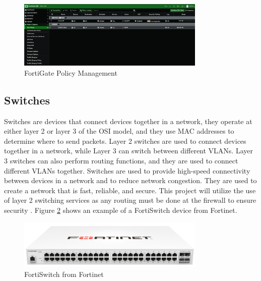 \documentclass[12pt]{report}
\begin{document}
\begin{figure}[h]
    \centering
    \includegraphics[width=0.8\textwidth]{images/Policy.png}
    \caption{FortiGate Policy Management}
    \label{fig:FortiGatePolicy}
\end{figure}

\subsection{Switches}
Switches are devices that connect devices together in a network, they operate at either layer 2 or layer 3 of the OSI model, and they use MAC addresses to determine where to send packets. Layer 2 switches are used to connect devices together in a network, while Layer 3 can switch between different VLANs. Layer 3 switches can also perform routing functions, and they are used to connect different VLANs together. Switches are used to provide high-speed connectivity between devices in a network and to reduce network congestion. They are used to create a network that is fast, reliable, and secure. This project will utilize the use of layer 2 switching services as any routing must be done at the firewall to ensure security \cite{switch}. Figure \ref{fig:FortiSwitch} shows an example of a FortiSwitch device from Fortinet.
\begin{figure}[h]
    \centering
    \includegraphics[width=0.8\textwidth]{images/FortiSwitch.png}
    \caption{FortiSwitch from Fortinet \cite{FSIMG}}
    \label{fig:FortiSwitch}
\end{figure} 
\end{document}
